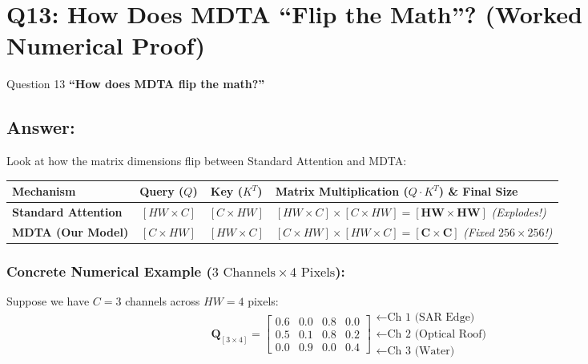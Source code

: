 \documentclass[11pt,a4paper]{article}
\begin{document}
\section{Q13: How Does MDTA ``Flip the Math''? (Worked Numerical Proof)}

\begin{questionbox}{Question 13}
\textbf{``How does MDTA flip the math?''}
\end{questionbox}

\subsection*{Answer:}
Look at how the matrix dimensions flip between Standard Attention and MDTA:

\begin{center}
\begin{tabularx}{\textwidth}{lccX}
\toprule
\textbf{Mechanism} & \textbf{Query ($Q$)} & \textbf{Key ($K^T$)} & \textbf{Matrix Multiplication ($Q \cdot K^T$) \& Final Size} \\
\midrule
\textbf{Standard Attention} & $[HW \times C]$ & $[C \times HW]$ & $[HW \times C] \times [C \times HW] = \mathbf{[HW \times HW]}$ \textit{(Explodes!)} \\
\textbf{MDTA (Our Model)} & $[C \times HW]$ & $[HW \times C]$ & $[C \times HW] \times [HW \times C] = \mathbf{[C \times C]}$ \textit{(Fixed $256\times 256$!)} \\
\bottomrule
\end{tabularx}
\end{center}

\subsubsection*{Concrete Numerical Example ($3\text{ Channels} \times 4\text{ Pixels}$):}
Suppose we have $C=3$ channels across $HW=4$ pixels:
$$\mathbf{Q}_{[3 \times 4]} = \begin{bmatrix}
0.6 & 0.0 & 0.8 & 0.0 \\
0.5 & 0.1 & 0.8 & 0.2 \\
0.0 & 0.9 & 0.0 & 0.4
\end{bmatrix} \begin{array}{l}
\leftarrow \text{Ch 1 (SAR Edge)} \\
\leftarrow \text{Ch 2 (Optical Roof)} \\
\leftarrow \text{Ch 3 (Water)}
\end{array}$$
\end{document}
